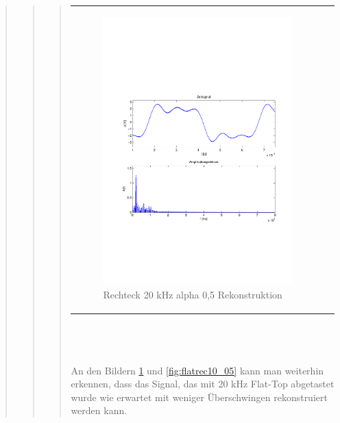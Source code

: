 \begin{quote}
\begin{quote}
\begin{quote}
\begin{center}
\begin{tabular}{ll}
                \begin{minipage}{0.6\textwidth}
                    \begin{figure}[H]
                        \includegraphics[scale=0.55, trim = 16mm 70mm 16mm 85mm, clip]{Bilder/flatrec20_05}
                       \caption{Rechteck 20 kHz alpha 0,5 Rekonstruktion}
		              \label{fig:flatrec20_05}
                    \end{figure}
                \end{minipage}
            
            \end{tabular}
            \end{center}
            \ \\
            \ \\
            \ \\
            An den Bildern \ref{fig:flatrec20_05} und \ref{fig:flatrec10_05} kann man weiterhin erkennen, dass das
            Signal, das mit 20 kHz Flat-Top abgetastet wurde wie erwartet mit weniger Überschwingen rekonstruiert werden kann.
            

\end{quote}
\end{quote}
\end{quote}
